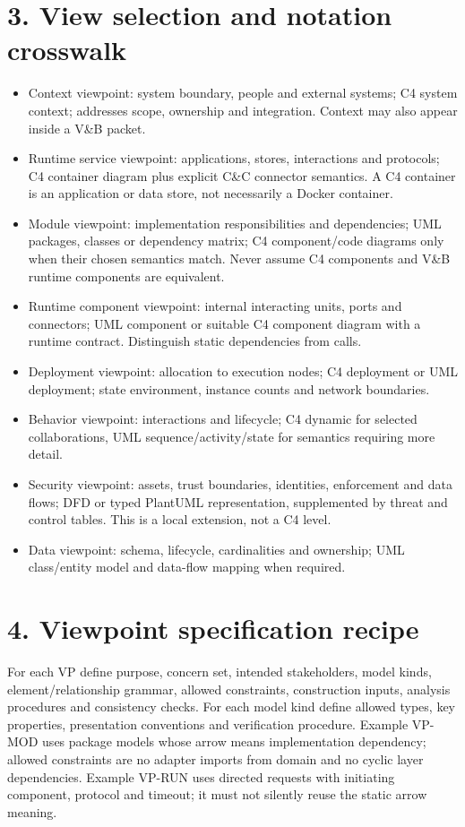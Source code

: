 \documentclass[11pt,letterpaper]{article}
\begin{document}
\section*{3. View selection and notation crosswalk}
\begin{itemize}
\item Context viewpoint: system boundary, people and external systems; C4 system context; addresses scope, ownership and integration. Context may also appear inside a V\&B packet.
\item Runtime service viewpoint: applications, stores, interactions and protocols; C4 container diagram plus explicit C\&C connector semantics. A C4 container is an application or data store, not necessarily a Docker container.
\item Module viewpoint: implementation responsibilities and dependencies; UML packages, classes or dependency matrix; C4 component/code diagrams only when their chosen semantics match. Never assume C4 components and V\&B runtime components are equivalent.
\item Runtime component viewpoint: internal interacting units, ports and connectors; UML component or suitable C4 component diagram with a runtime contract. Distinguish static dependencies from calls.
\item Deployment viewpoint: allocation to execution nodes; C4 deployment or UML deployment; state environment, instance counts and network boundaries.
\item Behavior viewpoint: interactions and lifecycle; C4 dynamic for selected collaborations, UML sequence/activity/state for semantics requiring more detail.
\item Security viewpoint: assets, trust boundaries, identities, enforcement and data flows; DFD or typed PlantUML representation, supplemented by threat and control tables. This is a local extension, not a C4 level.
\item Data viewpoint: schema, lifecycle, cardinalities and ownership; UML class/entity model and data-flow mapping when required.
\end{itemize}
\section*{4. Viewpoint specification recipe}
For each VP define purpose, concern set, intended stakeholders, model kinds, element/relationship grammar, allowed constraints, construction inputs, analysis procedures and consistency checks. For each model kind define allowed types, key properties, presentation conventions and verification procedure. Example VP-MOD uses package models whose arrow means implementation dependency; allowed constraints are no adapter imports from domain and no cyclic layer dependencies. Example VP-RUN uses directed requests with initiating component, protocol and timeout; it must not silently reuse the static arrow meaning.\par\smallskip
\end{document}
